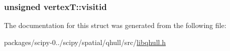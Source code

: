 \subsubsection[{visitid}]{\setlength{\rightskip}{0pt plus 5cm}unsigned vertex\+T\+::visitid}\label{structvertexT_adde2f0618a40366ff4d1a420c334222f}


The documentation for this struct was generated from the following file\+:\begin{DoxyCompactItemize}
\item 
packages/scipy-\/0../scipy/spatial/qhull/src/\hyperlink{libqhull_8h}{libqhull.\+h}\end{DoxyCompactItemize}
